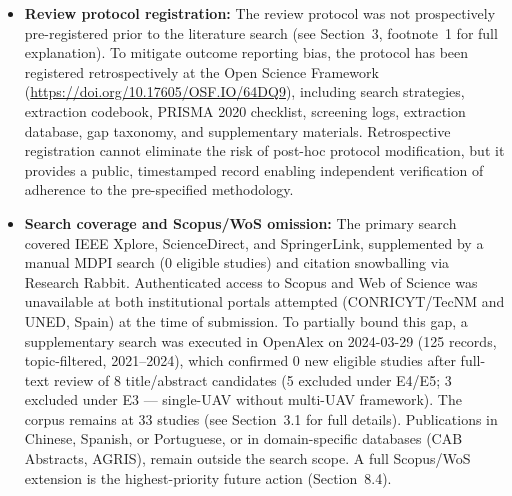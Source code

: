 \documentclass[review,3p,times]{elsarticle}
\begin{document}
\begin{itemize}
  \item \textbf{Review protocol registration:} The review protocol was not prospectively pre-registered prior to the literature search (see Section~3, footnote~1 for full explanation). To mitigate outcome reporting bias, the protocol has been registered retrospectively at the Open Science Framework (\url{https://doi.org/10.17605/OSF.IO/64DQ9}), including search strategies, extraction codebook, PRISMA 2020 checklist, screening logs, extraction database, gap taxonomy, and supplementary materials. Retrospective registration cannot eliminate the risk of post-hoc protocol modification, but it provides a public, timestamped record enabling independent verification of adherence to the pre-specified methodology.
  \item \textbf{Search coverage and Scopus/WoS omission:} The primary search covered IEEE Xplore, ScienceDirect, and SpringerLink, supplemented by a manual MDPI search (0 eligible studies) and citation snowballing via Research Rabbit. Authenticated access to Scopus and Web of Science was unavailable at both institutional portals attempted (CONRICYT/TecNM and UNED, Spain) at the time of submission. To partially bound this gap, a supplementary search was executed in OpenAlex on 2024-03-29 (125 records, topic-filtered, 2021--2024), which confirmed 0 new eligible studies after full-text review of 8 title/abstract candidates (5 excluded under E4/E5; 3 excluded under E3 — single-UAV without multi-UAV framework). The corpus remains at 33 studies (see Section~3.1 for full details). Publications in Chinese, Spanish, or Portuguese, or in domain-specific databases (CAB Abstracts, AGRIS), remain outside the search scope. A full Scopus/WoS extension is the highest-priority future action (Section~8.4).

\end{itemize}
\end{document}
